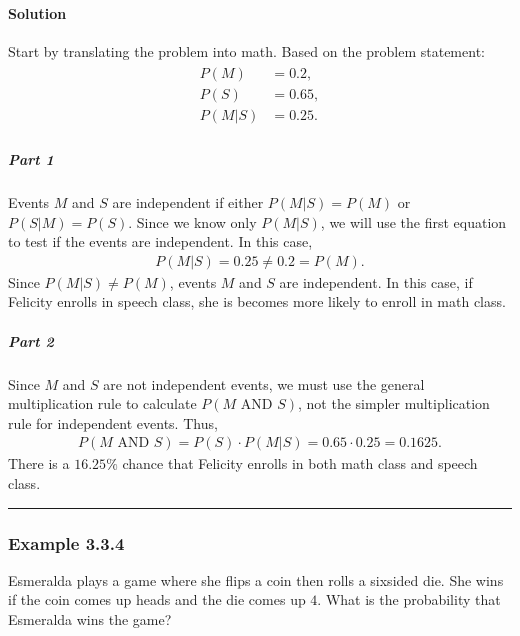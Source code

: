 \documentclass[letterpaper,10pt,english]{jupyterBook}
\begin{document}
\paragraph{Solution}
\label{\detokenize{Ch3 Probability/3.3 Multiplication Rules and Independent Events:id2}}
\sphinxAtStartPar
Start by translating the problem into math. Based on the problem statement:
\begin{equation*}
\begin{split}
\begin{align}
P(M) &= 0.2, \\
P(S) &= 0.65, \\
P(M|S) &= 0.25.
\end{align}
\end{split}
\end{equation*}

\subparagraph{Part 1}
\label{\detokenize{Ch3 Probability/3.3 Multiplication Rules and Independent Events:id3}}
\sphinxAtStartPar
Events \(M\) and \(S\) are independent if either \(P(M|S) = P(M)\) or \(P(S|M) = P(S)\). Since we know only \(P(M|S)\), we will use the first equation to test if the events are independent. In this case,
\begin{equation*}
\begin{split} P(M|S) = 0.25 \neq 0.2 = P(M). \end{split}
\end{equation*}
\sphinxAtStartPar
Since \(P(M|S) \neq P(M)\), events \(M\) and \(S\) are  independent. In this case, if Felicity enrolls in speech class, she is becomes more likely to enroll in math class.


\subparagraph{Part 2}
\label{\detokenize{Ch3 Probability/3.3 Multiplication Rules and Independent Events:id4}}
\sphinxAtStartPar
Since \(M\) and \(S\) are not independent events, we must use the general multiplication rule to calculate \(P(M \text{ AND } S)\), not the simpler multiplication rule for independent events. Thus,
\begin{equation*}
\begin{split}P(M\text{ AND }S) = P(S) \cdot P(M|S) = 0.65 \cdot 0.25 = 0.1625. \end{split}
\end{equation*}
\sphinxAtStartPar
There is a \(16.25\%\) chance that Felicity enrolls in both math class and speech class.


\bigskip\hrule\bigskip



\subsubsection{Example 3.3.4}
\label{\detokenize{Ch3 Probability/3.3 Multiplication Rules and Independent Events:example-3-3-4}}
\sphinxAtStartPar
Esmeralda plays a game where she flips a coin then rolls a six\sphinxhyphen{}sided die. She wins if the coin comes up heads and the die comes up \(4\). What is the probability that Esmeralda wins the game?
\end{document}

